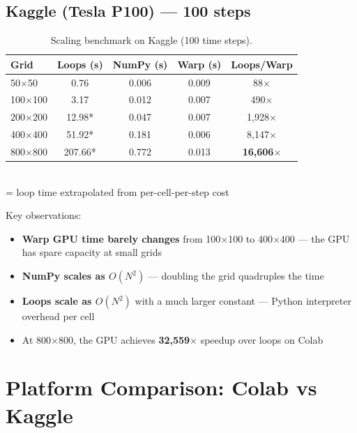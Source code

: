 \documentclass[11pt,a4paper]{article}
\begin{document}
\subsection{Kaggle (Tesla P100) --- 100 steps}

\begin{table}[H]
\centering
\caption{Scaling benchmark on Kaggle (100 time steps).}
\begin{tabular}{@{}lcccc@{}}
\toprule
\textbf{Grid} & \textbf{Loops (s)} & \textbf{NumPy (s)} & \textbf{Warp (s)} & \textbf{Loops/Warp} \\
\midrule
50$\times$50     & 0.76   & 0.006 & 0.009 & 88$\times$ \\
100$\times$100   & 3.17   & 0.012 & 0.007 & 490$\times$ \\
200$\times$200   & 12.98* & 0.047 & 0.007 & 1,928$\times$ \\
400$\times$400   & 51.92* & 0.181 & 0.006 & 8,147$\times$ \\
800$\times$800   & 207.66* & 0.772 & 0.013 & \textbf{16,606$\times$} \\
\bottomrule
\end{tabular}
\\[4pt]
{\footnotesize * = loop time extrapolated from per-cell-per-step cost}
\end{table}

Key observations:
\begin{itemize}[nosep]
    \item \textbf{Warp GPU time barely changes} from 100$\times$100 to 400$\times$400 --- the GPU has spare capacity at small grids
    \item \textbf{NumPy scales as $O(N^2)$} --- doubling the grid quadruples the time
    \item \textbf{Loops scale as $O(N^2)$} with a much larger constant --- Python interpreter overhead per cell
    \item At 800$\times$800, the GPU achieves \textbf{32,559$\times$} speedup over loops on Colab
\end{itemize}


\section{Platform Comparison: Colab vs Kaggle}
\end{document}
